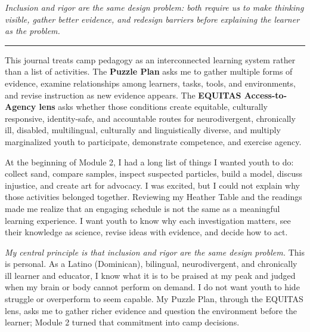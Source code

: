 \documentclass[11pt,letterpaper]{article}
\newcommand{\reviewsection}[1]{\Needspace{5\baselineskip}\vspace{0.07in}\noindent{\normalsize\bfseries\color{PrimaryRed}#1}\par\vspace{0.02in}}
\begin{document}
\begin{titlepage}
\vfill

\begin{center}
\begin{minipage}{0.92\textwidth}
\centering\itshape
Inclusion and rigor are the same design problem: both require us to make thinking visible, gather better evidence, and redesign barriers before explaining the learner as the problem.\\
{\color{PrimaryRed}\rule{4in}{0.8pt}}
\end{minipage}
\end{center}

\vfill

\begin{center}
\begin{minipage}{0.95\textwidth}
\small
This journal treats camp pedagogy as an interconnected learning system rather than a list of activities. The \textbf{Puzzle Plan} asks me to gather multiple forms of evidence, examine relationships among learners, tasks, tools, and environments, and revise instruction as new evidence appears. The \textbf{EQUITAS Access-to-Agency lens} asks whether those conditions create equitable, culturally responsive, identity-safe, and accountable routes for neurodivergent, chronically ill, disabled, multilingual, culturally and linguistically diverse, and multiply marginalized youth to participate, demonstrate competence, and exercise agency.
\end{minipage}
\end{center}

\restoregeometry
\end{titlepage}
\hypersetup{pageanchor=true}

\reviewsection{Journal Focus}

At the beginning of Module 2, I had a long list of things I wanted youth to do: collect sand, compare samples, inspect suspected particles, build a model, discuss injustice, and create art for advocacy. I was excited, but I could not explain why those activities belonged together. Reviewing my Heather Table and the readings made me realize that an engaging schedule is not the same as a meaningful learning experience. I want youth to know why each investigation matters, see their knowledge as science, revise ideas with evidence, and decide how to act.

\textit{My central principle is that inclusion and rigor are the same design problem.} This is personal. As a Latino (Dominican), bilingual, neurodivergent, and chronically ill learner and educator, I know what it is to be praised at my peak and judged when my brain or body cannot perform on demand. I do not want youth to hide struggle or overperform to seem capable. My Puzzle Plan, through the EQUITAS lens, asks me to gather richer evidence and question the environment before the learner; Module 2 turned that commitment into camp decisions.
\end{document}
